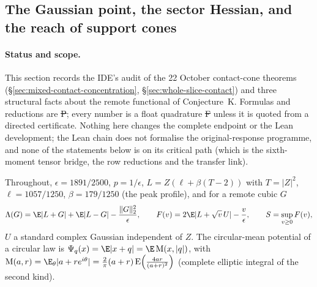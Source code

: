 \subsection{The Gaussian point, the sector Hessian, and the reach of support cones}
\label{sec:gaussian-point-cone-reach}

\paragraph{Status and scope.}
This section records the IDE's audit of the 22 October contact-cone
theorems (\S\ref{sec:mixed-contact-concentration},
\S\ref{sec:whole-slice-contact}) and three structural facts about the
remote functional of Conjecture~K. Formulas and reductions are
\st{P}; every number is a float quadrature \st{F} unless it is quoted
from a directed certificate. Nothing here changes the complete endpoint
or the Lean development; the Lean chain does not formalise the
original-response programme, and none of the statements below is on
its critical path (which is the sixth-moment tensor bridge, the row
reductions and the transfer link).

Throughout, $\epsilon=1891/2500$, $p=1/\epsilon$,
$L=Z(\ell+\beta(T-2))$ with $T=|Z|^2$, $\ell=1057/1250$,
$\beta=179/1250$ (the peak profile), and for a remote cubic $G$
\[
 \Lambda(G)=\E|L+G|+\E|L-G|-\frac{\|G\|_2^2}{\epsilon},
 \qquad
 F(v)=2\E|L+\sqrt v\,U|-\frac v\epsilon,\qquad S=\sup_{v\ge0}F(v),
\]
$U$ a standard complex Gaussian independent of $Z$. The circular-mean
potential of a circular law is
$\Psi_q(x)=\E|x+q|=\E\,\mathrm{M}(x,|q|)$, with
$\mathrm M(a,r)=\E_\theta|a+re^{i\theta}|=\frac2\pi(a+r)\,
\mathrm{E}\!\left(\frac{4ar}{(a+r)^2}\right)$ (complete elliptic
integral of the second kind).

